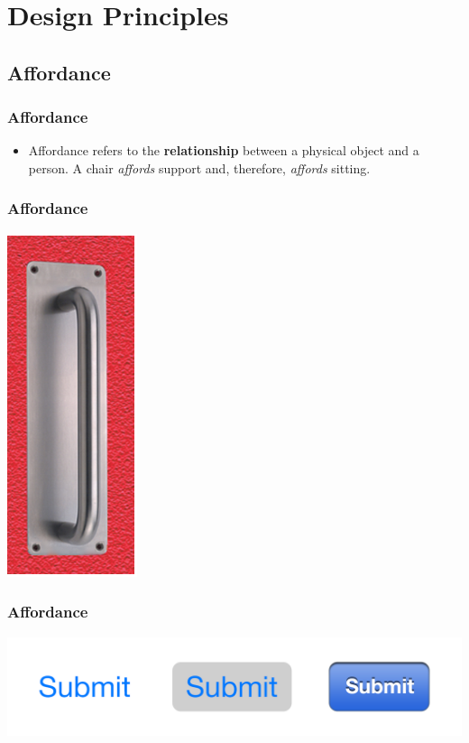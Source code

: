 \documentclass{beamer}
\begin{document}
\section{Design Principles}

\subsection{Affordance}

\begin{frame}
\frametitle{Affordance}
\begin{itemize}
	\item Affordance refers to the \textbf{relationship} between a physical object and a person.  A chair \textit{affords} support and, therefore, \textit{affords} sitting.  
\end{itemize}
\end{frame}

\begin{frame}
\frametitle{Affordance}
\centering
\includegraphics[width=0.2\linewidth]{affordance1}
\end{frame}

\begin{frame}
\frametitle{Affordance}
\centering
\includegraphics[width=0.8\linewidth]{affordance2}
\end{frame}
\end{document}
